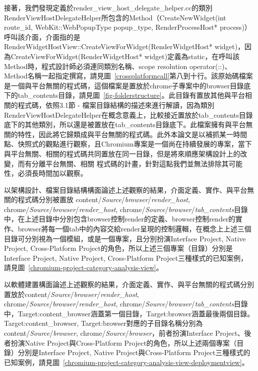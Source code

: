接著，我們發現定義於render\_view\_host\_delegate\_helper.cc的類別Render\-View\-Host\-Delegate\-Helper所包含的Method（Create\-New\-Widget(int route\_id, WebKit::Web\-Popup\-Type popup\_type, Render\-Process\-Host* process)）呼叫該介面，介面指的是Render\-Widget\-HostView::Create\-View\-For\-Widget\-(Render\-Widget\-Host* widget)，因為CreateViewForWidget(RenderWidgetHost* widget)定義為static，在呼叫該Method時，程式設計師必須連同類別名稱、scope resolution operator(::)、Method名稱一起指定撰寫，請見圖~\ref{crossplatformcall}第八到十行。該原始碼檔案是一個與平台無關的程式碼，這個檔案是置放於chrome子專案中的browser目錄底下的tab\_contents目錄，請見圖~\ref{fig-folderstructure}。此目錄有置放其他與平台相關的程式碼，依照3.1節 - 檔案目錄結構的描述來進行解讀，因為類別Render\-View\-Host\-Delegate\-Helper在概念意義上，比較接近置放於tab\_contents目錄底下的其他類別，所以還是被置放在tab\_contents目錄底下。此檔案擁有與平台無關的特性，因此將它歸類成與平台無關的程式碼。此外本論文是以補抓某一時間點、快照式的觀點進行觀察，且Chromium專案是一個尚在持續發展的專案，當下與平台無關、相關的程式碼共同置放在同一目錄，但是將來順應架構設計上的改變，而有分離平台無關、相關
程式碼的計畫，針對這點我們並無法排除其可能性，必須長時間加以觀察。

以架構設計、檔案目錄結構構面論述上述觀察的結果，介面定義、實作、與平台無關的程式碼分別被置放%
content\-/\textit{Source}\-/\textit{browser}\-/\textit{render\_host}\-,%
chrome\-/\textit{Source}\-/\textit{browser}\-/\textit{render\_host}\-,%
chrome\-/\textit{Source}\-/\textit{browser}\-/\textit{tab\_contents}\-目錄中，在上述目錄中分別包含browser控制render的定義、browser控制render的實作、browser將每一個tab中的內容交給render呈現的控制邏輯，在概念上上述三個目錄可分別視為一個模組，或是一個專案，且分別扮演Interface Project, Native Project, Cross-Platform Project的角色，所以上述三個專案（目錄）分別是Interface Project, Native Project, Cross-Platform Project三種樣式的已知案例，請見圖~\ref{chromium-project-category-analysis-view}。

以軟體建置構面論述上述觀察的結果，介面定義、實作、與平台無關的程式碼分別置放於content\-/\textit{Source}\-/\textit{browser}\-/\textit{render\_host}, chrome\-/\textit{Source}\-/\textit{browser}\-/\textit{render\_host}, chrome\-/\textit{Source}\-/\textit{browser}\-/\textit{tab\_contents}目錄中，Target:content\_browser涵蓋第一個目錄，Target:browser涵蓋最後兩個目錄。Target:content\_browser, Target:browser對應的子目錄名稱分別為content\-/\textit{Source}\-/\textit{browser}, chrome\-/\textit{Source}\-/\textit{browser}，前者扮演Interface Project、後者扮演Native Project與Cross-Platform Project的角色，所以上述兩個專案（目錄）分別是Interface Project, Native Project與Cross-Platform Project三種樣式的已知案例，請見圖~\ref{chromium-project-category-analysis-view-deploymentview}。

